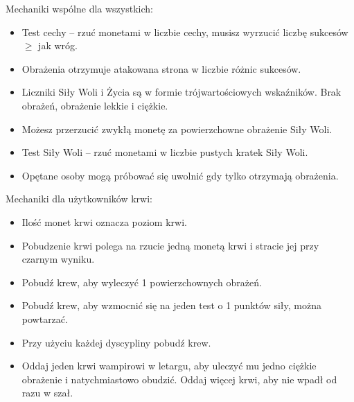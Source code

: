 	Mechaniki wspólne dla wszystkich:
	\begin{itemize}
		\item Test cechy -- rzuć monetami w liczbie cechy, musisz wyrzucić liczbę sukcesów $\geqslant$ jak wróg.
		\item Obrażenia otrzymuje atakowana strona w liczbie różnic sukcesów.
		\item Liczniki Siły Woli i Życia są w formie trójwartościowych wskaźników. Brak obrażeń, obrażenie lekkie i ciężkie.
		\item Możesz przerzucić zwykłą monetę za powierzchowne obrażenie Siły Woli.
		\item Test Siły Woli -- rzuć monetami w liczbie pustych kratek Siły Woli.
		\item Opętane osoby mogą próbować się uwolnić gdy tylko otrzymają obrażenia.
	\end{itemize}

	Mechaniki dla użytkowników krwi:
	\begin{itemize}
		\item Ilość monet krwi oznacza poziom krwi.
		\item Pobudzenie krwi polega na rzucie jedną monetą krwi i stracie jej przy czarnym wyniku.
		\item Pobudź krew, aby wyleczyć 1 powierzchownych obrażeń.
		\item Pobudź krew, aby wzmocnić się na jeden test o 1 punktów siły, można powtarzać.
		\item Przy użyciu każdej dyscypliny pobudź krew.
		\item Oddaj jeden krwi wampirowi w letargu, aby uleczyć mu jedno ciężkie obrażenie i natychmiastowo obudzić. Oddaj więcej krwi, aby nie wpadł od razu w szał.
	\end{itemize}

